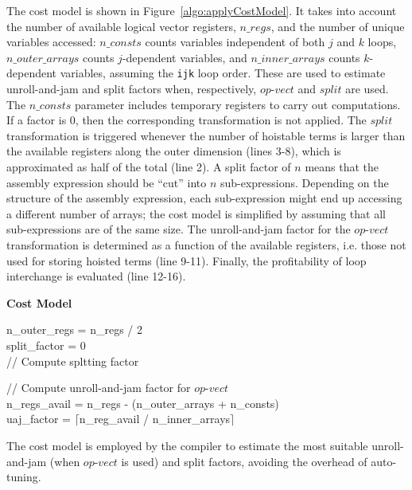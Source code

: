 \documentclass[conference]{IEEEtran}
\begin{document}
The cost model is shown in Figure~\ref{algo:applyCostModel}. It takes into account the number of available logical vector registers, $n\_regs$, and the number of unique variables accessed: $n\_consts$ counts variables independent of both $j$ and $k$ loops, $n\_outer\_arrays$ counts $j$-dependent variables, and $n\_inner\_arrays$ counts $k$-dependent variables, assuming the \texttt{ijk} loop order. These are used to estimate unroll-and-jam and split factors when, respectively, $op$-$vect$ and $split$ are used. The $n\_consts$ parameter includes temporary registers to carry out computations. If a factor is 0, then the corresponding transformation is not applied. The $split$ transformation is triggered whenever the number of hoistable terms is larger than the available registers along the outer dimension (lines 3-8), which is approximated as half of the total (line 2). A split factor of $n$ means that the assembly expression should be ``cut'' into $n$ sub-expressions. Depending on the structure of the assembly expression, each sub-expression might end up accessing a different number of arrays; the cost model is simplified by assuming that all sub-expressions are of the same size. The unroll-and-jam factor for the $op$-$vect$ transformation is determined as a function of the available registers, i.e. those not used for storing hoisted terms (line 9-11). Finally, the profitability of loop interchange is evaluated (line 12-16).


\begin{algorithm}[t]
\label{algo:applyCostModel}
  \textbf{Cost Model}\\

n\_outer\_regs = n\_regs / 2 \\
split\_factor = 0 \\ 
// Compute spltting factor \\

// Compute unroll-and-jam factor for $op$-$vect$ \\
n\_regs\_avail = n\_regs - (n\_outer\_arrays + n\_consts)\\
uaj\_factor = $\lceil$n\_reg\_avail / n\_inner\_arrays$\rceil$ \\
\caption{The cost model is employed by the compiler to estimate the most suitable unroll-and-jam (when $op$-$vect$ is used) and split factors, avoiding the overhead of auto-tuning.}
\end{algorithm}
\end{document}
